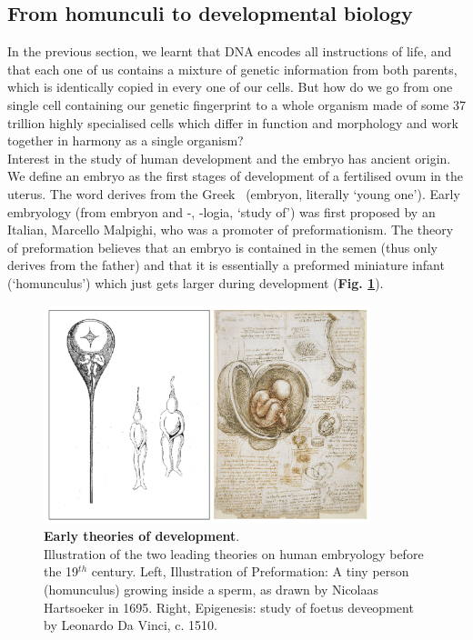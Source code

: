 \newpage

\subsection{From homunculi to developmental biology}
\label{sec:history_developmental_biology}

In the previous section, we learnt that DNA encodes all instructions of life, and that each one of us contains a mixture of genetic information from both parents, which is identically copied in every one of our cells.
But how do we go from one single cell containing our genetic fingerprint to a whole organism made of some 37 trillion highly specialised cells which differ in function and morphology and work together in harmony as a single organism?\\

Interest in the study of human development and the embryo has ancient origin.
We define an embryo as the first stages of development of a fertilised ovum in the uterus.
The word derives from the Greek \textepsilon\textmu\textbeta\textrho\textupsilon\textomikron\textnu \ (embryon, literally `young one').
Early embryology (from embryon and -\textlambda\textomikron\textgamma\textiota\textalpha, -logia, `study of') was first proposed by an Italian, Marcello Malpighi, who was a promoter of preformationism.
The theory of preformation believes that an embryo is contained in the semen (thus only derives from the father) and that it is essentially a preformed miniature infant (`homunculus') which just gets larger during development (\textbf{Fig. \ref{fig:early_embryology}}).\\

\begin{figure}
\includegraphics[width=9.5cm]{Chapter1/Fig/Early_theories_development.png}
\caption[Early theories of development]{\textbf{Early theories of development}.\\
Illustration of the two leading theories on human embryology before the 19$^{th}$ century.
Left, Illustration of Preformation: 
A tiny person (homunculus) growing inside a sperm, as drawn by Nicolaas Hartsoeker in 1695.
Right, Epigenesis: study of foetus deveopment by Leonardo Da Vinci, c. 1510.}
\label{fig:early_embryology}
\end{figure}

